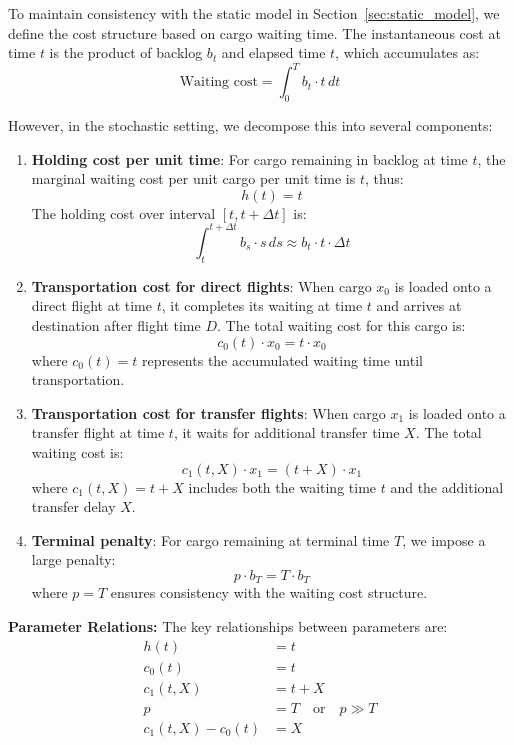 \documentclass[opre,sglanonrev]{informs4}
\begin{document}
{\color{brown}
To maintain consistency with the static model in Section~\ref{sec:static_model}, we define the cost structure based on cargo waiting time. The instantaneous cost at time \( t \) is the product of backlog \( b_t \) and elapsed time \( t \), which accumulates as:
\[
\text{Waiting cost} = \int_0^T b_t \cdot t \, dt
\]

However, in the stochastic setting, we decompose this into several components:

\begin{enumerate}
    \item \textbf{Holding cost per unit time}: For cargo remaining in backlog at time \( t \), the marginal waiting cost per unit cargo per unit time is \( t \), thus:
    \[
    h(t) = t
    \]
    The holding cost over interval \( [t, t+\Delta t] \) is:
    \[
    \int_t^{t+\Delta t} b_s \cdot s \, ds \approx b_t \cdot t \cdot \Delta t
    \]
    
    \item \textbf{Transportation cost for direct flights}: When cargo \( x_0 \) is loaded onto a direct flight at time \( t \), it completes its waiting at time \( t \) and arrives at destination after flight time \( D \). The total waiting cost for this cargo is:
    \[
    c_0(t) \cdot x_0 = t \cdot x_0
    \]
    where \( c_0(t) = t \) represents the accumulated waiting time until transportation.
    
    \item \textbf{Transportation cost for transfer flights}: When cargo \( x_1 \) is loaded onto a transfer flight at time \( t \), it waits for additional transfer time \( X \). The total waiting cost is:
    \[
    c_1(t, X) \cdot x_1 = (t + X) \cdot x_1
    \]
    where \( c_1(t, X) = t + X \) includes both the waiting time \( t \) and the additional transfer delay \( X \).
    
    \item \textbf{Terminal penalty}: For cargo remaining at terminal time \( T \), we impose a large penalty:
    \[
    p \cdot b_T = T \cdot b_T
    \]
    where \( p = T \) ensures consistency with the waiting cost structure.
\end{enumerate}

\textbf{Parameter Relations:}
The key relationships between parameters are:
\begin{align}
h(t) &= t \label{eq:holding_cost} \\
c_0(t) &= t \label{eq:direct_cost} \\
c_1(t, X) &= t + X \label{eq:transfer_cost} \\
p &= T \quad \text{or} \quad p \gg T \label{eq:penalty_cost} \\
c_1(t, X) - c_0(t) &= X \label{eq:cost_difference}
\end{align}

}
\end{document}
